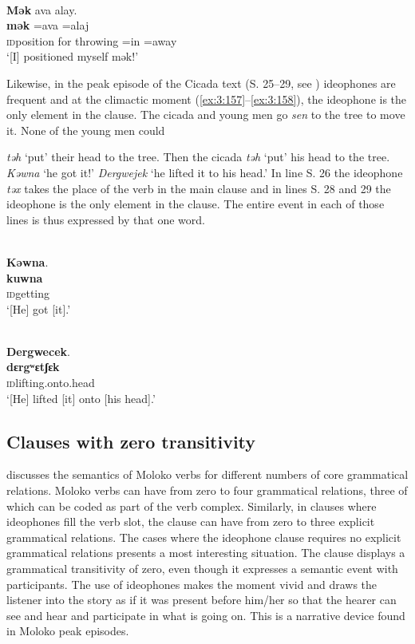 \ea \label{ex:3:156}\\
\textbf{Mək}  ava  alay.\\
\gll  \textbf{mək}  =ava   =alaj\\
      {\textsc{id}position for throwing}  =in    =away\\
\glt  ‘[I] positioned myself mək!’
\z

\largerpage
Likewise, in the peak episode of the Cicada text (S. 25--29, see ) ideophones are frequent and at the climactic moment (\ref{ex:3:157}--\ref{ex:3:158}), the ideophone is the only element in the clause. The cicada and young men go \textit{sen} to the tree to move it. None of the young men could {\textit{təh} ‘put' their head to the tree. Then the cicada \textit{təh} ‘put' his head to the tree. \textit{Kəwna} ‘he got it!' \textit{ Dergwejek} ‘he lifted it to his head.' In line S. 26 the ideophone \textit{təx} takes the place of the verb in the main clause and in lines S. 28 and 29 the ideophone is the only element in the clause. The entire event in each of those lines is thus expressed by that one word. 


\ea \label{ex:3:157}\\
\textbf{Kəwna}.\\
\gll  \textbf{kuwna}\\
      \textsc{id}getting\\
\glt  ‘[He] got [it].’ 
\z


\ea \label{ex:3:158}\\
\textbf{Dergwecek}.~\\
\gll  \textbf{dɛrgʷɛtʃɛk}\\
      {\textsc{id}lifting.onto.head}\\
\glt  ‘[He] lifted [it] onto [his head].’
\z

\subsection{Clauses with zero transitivity}\label{sec:3.6.3}
\hypertarget{RefHeading1211301525720847}{}
\largerpage
{} discusses the semantics of Moloko verbs for different numbers of core grammatical relations. Moloko verbs can have from zero to four grammatical relations, three of which can be coded as part of the verb complex.  Similarly, in clauses where ideophones fill the verb slot, the clause can have from zero to three explicit grammatical relations. The cases where the ideophone clause requires no explicit grammatical relations presents a most interesting situation. The clause displays a grammatical transitivity of zero, even though it expresses a semantic event with participants. The use of ideophones makes the moment vivid and draws the listener into the story as if it was present before him/her so that the hearer can see and hear and participate in what is going on. This is a narrative device found in Moloko peak episodes.

}
